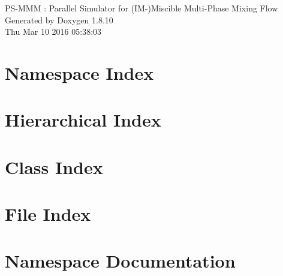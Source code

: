 \documentclass[twoside]{article}
\newcommand{\+}{\discretionary{\mbox{\scriptsize$\hookleftarrow$}}{}{}}
\begin{document}
\hypersetup{pageanchor=false,
             bookmarks=true,
             bookmarksnumbered=true,
             pdfencoding=unicode
            }
\begin{titlepage}
\vspace*{7cm}
\begin{center}%
{\Large P\+S-\/\+M\+M\+M \+: Parallel Simulator for (I\+M-\/)Miscible Multi-\/\+Phase Mixing Flow }\\
\vspace*{1cm}
{\large Generated by Doxygen 1.8.10}\\
\vspace*{0.5cm}
{\small Thu Mar 10 2016 05:38:03}\\
\end{center}
\end{titlepage}
\tableofcontents
{}
\hypersetup{pageanchor=true}

\section{Namespace Index}

\section{Hierarchical Index}

\section{Class Index}

\section{File Index}

\section{Namespace Documentation}










\end{document}
